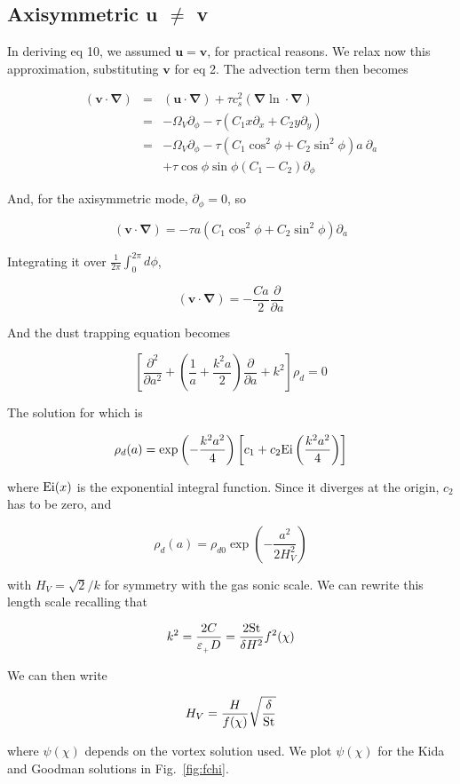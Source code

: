 \documentclass[useAMS,8pt,twocolumn]{article}
\newcommand{\pderiv}[2]{\frac{\partial #1}{\partial #2}}
\newcommand{\pderivn}[3]{\frac{\partial^{#3} #1}{\partial #2^{#3}}}
\renewcommand{\v}[1]{{\boldsymbol{#1}}} %
\newcommand{\del}{\v{\nabla}}
\newcommand{\grad}{\del}
\newcommand{\Fig}[1]{Fig.~\ref{#1}}
\newcommand{\fig}[1]{\Fig{#1}}
\newcommand{\beq}{\begin{equation}}
\newcommand{\eeq}{\end{equation}}
\newcommand{\beqn}{\begin{eqnarray}}
\newcommand{\eeqn}{\end{eqnarray}}
\newcommand{\epsp}{\varepsilon_{_{+}}}
\begin{document}
\subsection{Axisymmetric u $\ne$ v }

In deriving eq 10, we assumed $\v{u}=\v{v}$, for practical reasons. We
relax now this approximation, substituting $\v{v}$ for eq 2. The
advection term then becomes 

\beqn
(\v{v}\cdot\del) &=& (\v{u}\cdot\del)  + \tau c_s^2 (\grad\ln \cdot
\del) \nonumber \\
&=& - \varOmega_V \partial_\phi - \tau \left( C_1 x \partial_x + C_2 y
  \partial_y\right) \nonumber \\
&=& - \varOmega_V \partial_\phi - \tau \left( C_1 \cos^2\phi   + C_2
  \sin^2\phi \right) a \ \partial_a \nonumber \\
&&+ \tau \cos\phi\sin\phi  (C_1 - C_2) \partial_\phi
\eeqn

And, for the axisymmetric mode, $\partial_\phi=0$, so

\beq
(\v{v}\cdot\del) = - \tau a \left( C_1 
  \cos^2\phi  + C_2  \sin^2\phi \right) \partial_a
\eeq

Integrating it over $\frac{1}{2\pi}\int_0^{2\pi} d\phi$, 

\beq
(\v{v}\cdot\del) = - \frac{C a}{2} \pderiv{}{a}
\eeq

And the dust trapping equation becomes 

\beq
\left[\pderivn{}{a}{2} + \left(\frac{1}{a} +
  \frac{k^2a}{2}\right)\pderiv{}{a} + k^2\right]\rho_d = 0 
\eeq

The solution for which is 

\beq
\rho_d(a) = \exp\left(-\frac{k^2a^2}{4}\right)  \left[c_1 + c_2 {\rm
    Ei}\left(\frac{k^2a^2}{4}\right)\right]
\eeq

\noindent where ${\rm Ei}(x)$ is the exponential integral function. 
Since it diverges at the origin, $c_2$ has to be zero, and 

\beq
\rho_d(a) = \rho_{d0} \exp\left(-\frac{a^2}{2H_V^2}\right)
\eeq

with $H_V = \sqrt{2}/k$ for symmetry with the gas sonic scale. We can 
rewrite this length scale recalling that 

\beqn
k^2 = \frac{2C}{\epsp D} = \frac{2{\rm St}}{\delta H^2} f^2(\chi)
\eeqn 

\noindent We can then write 

\beq
 H_V = \frac{H}{f(\chi)} \sqrt{\frac{\delta}{\rm St}}
\eeq

\noindent where $\psi(\chi)$ depends on the vortex solution used. We plot 
$\psi(\chi)$ for the Kida and Goodman solutions in \fig{fig:fchi}.
\end{document}
